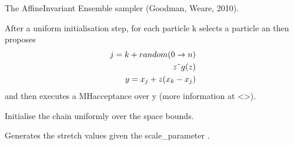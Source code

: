 \documentclass[letterpaper,10pt,english,openany,oneside]{sphinxmanual}
\begin{document}
\begin{fulllineitems}
\label{\detokenize{autogen:samplers.AIESampler}}
The Affine\sphinxhyphen{}Invariant Ensemble sampler (Goodman, Weare, 2010).

After a uniform initialisation step, for each particle k selects a  particle an then proposes
\begin{align*}\!\begin{aligned}
j = k + random(0 \rightarrow n)\\
z \char`~ g(z)\\
y = x_j + z (x_k - x_j)\\
\end{aligned}\end{align*}
and then executes a MH\sphinxhyphen{}acceptance over y (more information at <>).

\begin{fulllineitems}
\label{\detokenize{autogen:samplers.AIESampler.__init__}}
Initialise the chain uniformly over the space bounds.

\end{fulllineitems}


\begin{fulllineitems}
\label{\detokenize{autogen:samplers.AIESampler.get_stretch}}
Generates the stretch values given the scale\_parameter .


\end{fulllineitems}
\end{fulllineitems}
\end{document}
